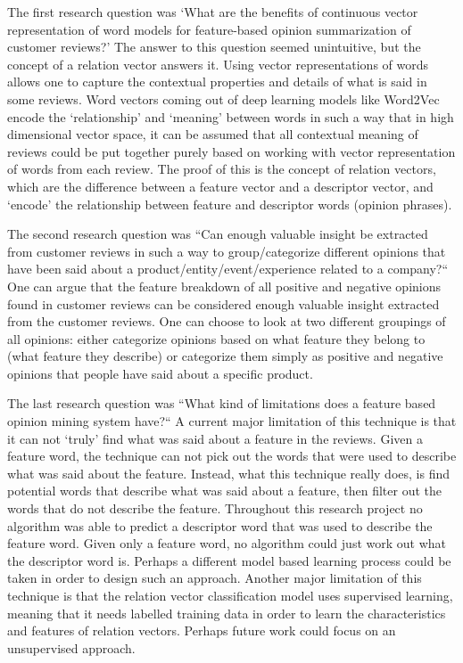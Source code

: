 \documentclass{sig-alternate}
\begin{document}
The first research question was `What are the benefits of continuous vector representation of word models for feature-based opinion summarization of customer reviews?' The answer to this question seemed unintuitive, but the concept of a relation vector answers it. Using vector representations of words allows one to capture the contextual properties and details of what is said in some reviews. Word vectors coming out of deep learning models like Word2Vec\cite{MikolovChenCorradoDean2013b} encode the `relationship' and `meaning' between words in such a way that in high dimensional vector space, it can be assumed that all contextual meaning of reviews could be put together purely based on working with vector representation of words from each review. The proof of this is the concept of relation vectors, which are the difference between a feature vector and a descriptor vector, and `encode' the relationship between feature and descriptor words (opinion phrases).

The second research question was ``Can enough valuable insight be extracted from customer reviews in such a way to group/categorize different opinions that have been said about a product/entity/event/experience related to a company?``  One can argue that the feature breakdown of all positive and negative opinions found in customer reviews can be considered enough valuable insight extracted from the customer reviews. One can choose to look at two different groupings of all opinions: either categorize opinions based on what feature they belong to (what feature they describe) or categorize them simply as positive and negative opinions that people have said about a specific product.

The last research question was ``What kind of limitations does a feature based opinion mining system have?``  A current major limitation of this technique is that it can not `truly' find what was said about a feature in the reviews. Given a feature word, the technique can not pick out the words that were used to describe what was said about the feature. Instead, what this technique really does, is find potential words that describe what was said about a feature, then filter out the words that do not describe the feature. Throughout this research project no algorithm was able to predict a descriptor word that was used to describe the feature word. Given only a feature word, no algorithm could just work out what the descriptor word is. Perhaps a different model based learning process could be taken in order to design such an approach. Another major limitation of this technique is that the relation vector classification model uses supervised learning, meaning that it needs labelled training data in order to learn the characteristics and features of relation vectors. Perhaps future work could focus on an unsupervised approach.
\end{document}

